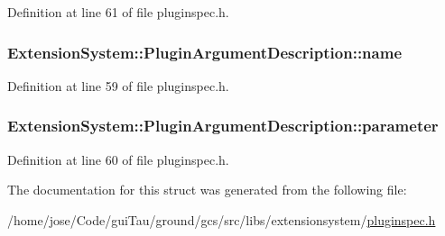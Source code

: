 Definition at line 61 of file pluginspec.\-h.

\hypertarget{struct_extension_system_1_1_plugin_argument_description_a495886e47df85811638066b4263f27a1}{
\subsubsection[{name}]{ Extension\-System\-::\-Plugin\-Argument\-Description\-::name}}\label{struct_extension_system_1_1_plugin_argument_description_a495886e47df85811638066b4263f27a1}


Definition at line 59 of file pluginspec.\-h.

\hypertarget{struct_extension_system_1_1_plugin_argument_description_a451dd714bb63d9c2125491f142939b01}{
\subsubsection[{parameter}]{ Extension\-System\-::\-Plugin\-Argument\-Description\-::parameter}}\label{struct_extension_system_1_1_plugin_argument_description_a451dd714bb63d9c2125491f142939b01}


Definition at line 60 of file pluginspec.\-h.



The documentation for this struct was generated from the following file\-:\begin{DoxyCompactItemize}
\item 
/home/jose/\-Code/gui\-Tau/ground/gcs/src/libs/extensionsystem/\hyperlink{pluginspec_8h}{pluginspec.\-h}\end{DoxyCompactItemize}
